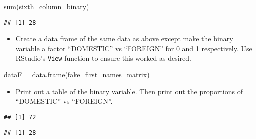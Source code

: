 \documentclass[
]{article}
\newenvironment{Shaded}{\begin{snugshade}}{\end{snugshade}}
\newcommand{\DecValTok}[1]{\textcolor[rgb]{0.00,0.00,0.81}{#1}}
\newcommand{\FunctionTok}[1]{\textcolor[rgb]{0.00,0.00,0.00}{#1}}
\newcommand{\NormalTok}[1]{#1}
\newcommand{\OtherTok}[1]{\textcolor[rgb]{0.56,0.35,0.01}{#1}}
\newcommand{\SpecialCharTok}[1]{\textcolor[rgb]{0.00,0.00,0.00}{#1}}
\providecommand{\tightlist}{%
  \setlength{\itemsep}{0pt}\setlength{\parskip}{0pt}}
\begin{document}
\begin{Shaded}
\begin{Highlighting}[]
\FunctionTok{sum}\NormalTok{(sixth\_column\_binary)}
\end{Highlighting}
\end{Shaded}

\begin{verbatim}
## [1] 28
\end{verbatim}

\begin{itemize}
\tightlist
\item
  Create a data frame of the same data as above except make the binary
  variable a factor ``DOMESTIC'' vs ``FOREIGN'' for 0 and 1
  respectively. Use RStudio's \texttt{View} function to ensure this
  worked as desired.
\end{itemize}

\begin{Shaded}
\begin{Highlighting}[]
\NormalTok{dataF }\OtherTok{=} \FunctionTok{data.frame}\NormalTok{(fake\_first\_names\_matrix)}
\end{Highlighting}
\end{Shaded}

\begin{itemize}
\tightlist
\item
  Print out a table of the binary variable. Then print out the
  proportions of ``DOMESTIC'' vs ``FOREIGN''.
\end{itemize}

\begin{Shaded}
\end{Shaded}

\begin{verbatim}
## [1] 72
\end{verbatim}

\begin{Shaded}
\end{Shaded}

\begin{verbatim}
## [1] 28
\end{verbatim}
\end{document}
